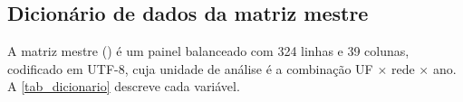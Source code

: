 
\begin{apendicesenv}
    \partapendices


    \begin{landscape}
    \chapter{Dicionário de dados da matriz mestre}
    \label{chap_apendice_dicionario}

    A matriz mestre () é um painel balanceado com 324 linhas e 39 colunas, codificado em UTF-8, cuja unidade de análise é a combinação UF $\times$ rede $\times$ ano.
    A \autoref{tab_dicionario} descreve cada variável.


\end{landscape}
\end{apendicesenv}
